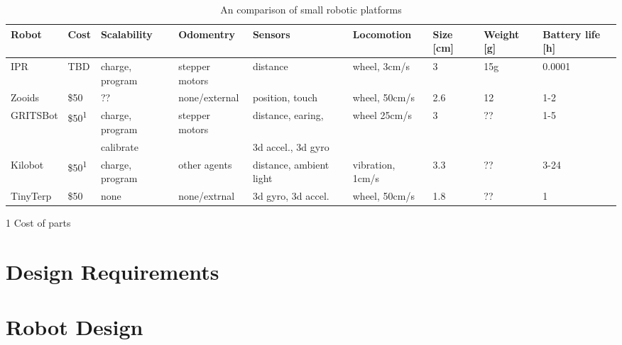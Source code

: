 \documentclass[letterpaper, 10 pt, conference]{ieeeconf}  %
\begin{document}
\begin{table*}[t]
	\centering
	\begin{threeparttable}
		\caption{An comparison of small robotic platforms}
		\label{tab:1}
 		\begin{tabular}{l l l l l l l l l} 
			\hline
 			Robot & Cost & Scalability & Odomentry & Sensors & Locomotion & Size [cm] & Weight [g] & Battery life [h] \\ 
 			\hline
 			IPR & TBD & charge, program & stepper motors & distance & wheel, 3cm/s & 3 & 15g & 0.0001\\
 			Zooids \cite{legoc_uist_2016} & \$50 & ?? & none/external & position, touch & wheel, 50cm/s & 2.6 & 12 & 1-2 \\ 
 			GRITSBot \cite{pickem_icra_2015} & \$50\textsuperscript{1} & charge, program & stepper motors & distance, earing, & wheel 25cm/s & 3 & ?? & 1-5 \\
 			 & & calibrate & & 3d accel., 3d gyro \\
 			Kilobot \cite{rubenstein_icra_2012} & \$50\textsuperscript{1} & charge, program & other agents & distance, ambient light & vibration, 1cm/s & 3.3 & ?? & 3-24\\
 			TinyTerp \cite{sabelhaus_icra_2013} & \$50 & none & none/extrnal & 3d gyro, 3d accel. & wheel, 50cm/s & 1.8 & ?? & 1\\
			\hline
		\end{tabular}
		\begin{tablenotes}
			\item [1] Cost of parts
		\end{tablenotes}
	\end{threeparttable}
\end{table*}

\section{Design Requirements}




\section{Robot Design}
\end{document}
